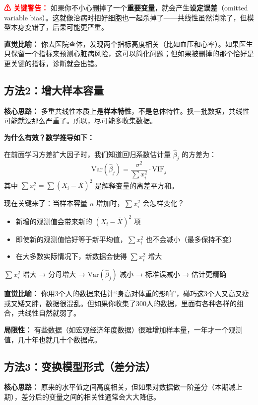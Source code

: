 \documentclass[12pt,a4paper]{ctexart}
\begin{document}
\textcolor{red}{\textbf{⚠ 关键警告：}} 如果你不小心删掉了一个\textbf{重要变量}，就会产生\textbf{设定误差}（omitted variable bias）。这就像治病时把好细胞也一起杀掉了——共线性虽然消除了，但模型本身变错了，后果可能更严重。

\textbf{直觉比喻：} 你去医院查体，发现两个指标高度相关（比如血压和心率）。如果医生只保留一个指标来预测心脏病风险，这可以简化问题；但如果被删掉的那个恰好是更关键的指标，诊断就会出错。

\subsection{方法2：增大样本容量}

\textbf{核心思路：} 多重共线性本质上是\textbf{样本特性}，不是总体特性。换一批数据，共线性可能就没那么严重了。所以，尽可能多收集数据。

\textbf{为什么有效？数学推导如下：}

在前面学习方差扩大因子时，我们知道回归系数估计量 $\hat{\beta}_j$ 的方差为：
\[
\text{Var}(\hat{\beta}_j) = \frac{\sigma^2}{\sum x_i^2} \cdot \text{VIF}_j
\]
其中 $\sum x_i^2 = \sum(X_i - \bar{X})^2$ 是解释变量的离差平方和。

现在关键来了：当样本容量 $n$ 增加时，$\sum x_i^2$ 会怎样变化？
\begin{itemize}
\item 新增的观测值会带来新的 $(X_i - \bar{X})^2$ 项
\item 即使新的观测值恰好等于新平均值，$\sum x_i^2$ 也不会减小（最多保持不变）
\item 在大多数实际情况下，新数据会使得 $\sum x_i^2$ 增大
\end{itemize}

$\sum x_i^2$ 增大 → 分母增大 → $\text{Var}(\hat{\beta}_j)$ 减小 → 标准误减小 → 估计更精确

\textbf{直觉比喻：} 你用3个人的数据来估计“身高对体重的影响”，碰巧这3个人又高又瘦或又矮又胖，数据很混乱。但如果你收集了300人的数据，里面有各种各样的组合，共线性自然就弱了。

\textbf{局限性：} 有些数据（如宏观经济年度数据）很难增加样本量，一年才一个观测值，几十年也就几十个数据点。

\subsection{方法3：变换模型形式（差分法）}

\textbf{核心思路：} 原来的水平值之间高度相关，但如果对数据做一阶差分（本期减上期），差分后的变量之间的相关性通常会大大降低。
\end{document}
